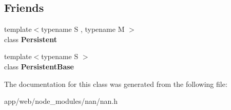 \subsection*{Friends}
\begin{DoxyCompactItemize}
\item 
\mbox{\label{class_nan_1_1_weak_callback_info_ad845ec8872174be0a9ca9a3dd1898d30}} 
{\footnotesize template$<$typename S , typename M $>$ }\\class {\bfseries Persistent}
\item 
\mbox{\label{class_nan_1_1_weak_callback_info_abb172e0bb22fc5fed7a3a66f29d046ce}} 
{\footnotesize template$<$typename S $>$ }\\class {\bfseries Persistent\+Base}
\end{DoxyCompactItemize}


The documentation for this class was generated from the following file\+:\begin{DoxyCompactItemize}
\item 
app/web/node\+\_\+modules/nan/nan.\+h\end{DoxyCompactItemize}
